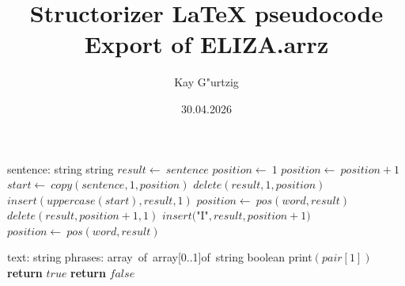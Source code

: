 \documentclass[a4paper,10pt]{article}
\title{Structorizer LaTeX pseudocode Export of ELIZA.arrz}
\author{Kay G"urtzig}
\date{30.04.2026}
\begin{document}
\begin{algorithm}
\caption{adjustSpelling(1)}
\begin{algorithmic}[5]
\State {}
    \State sentence: string
  \EndDecl
    \State string
  \EndDecl
  \State \(result\gets\ sentence\)
  \State \(position\gets\ 1\)
    \State \(position\gets\ position+1\)
  \EndWhile
    \State \(start\gets\ copy(sentence,1,position)\)
    \State \(delete(result,1,position)\)
    \State \(insert(uppercase(start),result,1)\)
  \EndIf
    \State \(position\gets\ pos(word,result)\)
      \State \(delete(result,position+1,1)\)
      \State \(insert(\)"{}I"{}\(,result,position+1)\)
      \State \(position\gets\ pos(word,result)\)
    \EndWhile
  \EndFor
\EndFunction
\end{algorithmic}
\end{algorithm}


\begin{algorithm}
\caption{checkGoodBye(2)}
\begin{algorithmic}[5]
\State {}
\State {}
\State {}
\State {}
    \State text: string
    \State phrases: array\ of\ array[0..1]of\ string
  \EndDecl
    \State boolean
  \EndDecl
      \State \(\)print\((pair[1])\)
      \State \textbf{return} \(true\)
    \EndIf
  \EndFor
  \State \textbf{return} \(false\)
\EndFunction
\end{algorithmic}
\end{algorithm}
\end{document}
